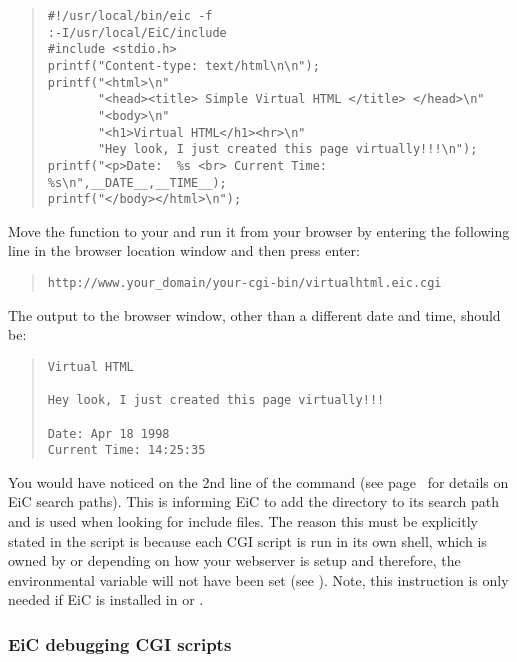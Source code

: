 \begin{quote}
\begin{verbatim}
#!/usr/local/bin/eic -f
:-I/usr/local/EiC/include
#include <stdio.h>
printf("Content-type: text/html\n\n");
printf("<html>\n"
       "<head><title> Simple Virtual HTML </title> </head>\n"
       "<body>\n"
       "<h1>Virtual HTML</h1><hr>\n"
       "Hey look, I just created this page virtually!!!\n");
printf("<p>Date:  %s <br> Current Time: %s\n",__DATE__,__TIME__);
printf("</body></html>\n");
\end{verbatim}
\end{quote}
Move the function to your  and
run it from your browser by entering the following
line in the browser location window and then press enter:
\begin{quote}
\begin{verbatim}
http://www.your_domain/your-cgi-bin/virtualhtml.eic.cgi
\end{verbatim}
\end{quote}
The output to the browser window, other than a different date and
time, should be:
\begin{quote}
\begin{verbatim}
Virtual HTML

Hey look, I just created this page virtually!!! 

Date: Apr 18 1998 
Current Time: 14:25:35 
\end{verbatim}
\end{quote} 

You would have noticed on the 2nd line of  the
command\newline {} (see
page~\pageref{item:comm-switch} for details on EiC search paths).
This is informing EiC to add the directory 
to its search path and is used when looking for include files.  The
reason this must be explicitly stated in the script is because each
CGI script is run in its own shell, which is owned by
 or
 depending on how your webserver is setup and therefore, the
 environmental variable will not have been set (see
).  Note, this instruction is only needed if EiC is 
 installed in  or .


\subsubsection{EiC debugging CGI scripts}
\label{sec:debuggingCGI}

